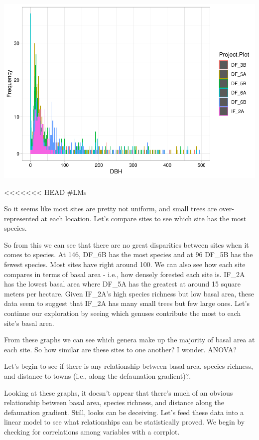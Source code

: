 \documentclass[
  12pt,
]{article}
\begin{document}
\includegraphics{GoldenGriffithsKnierMalinowski_ENV872_Project_files/figure-latex/DBH graphs-10.pdf}

\textless\textless\textless\textless\textless\textless\textless{} HEAD
\#LMs

So it seems like most sites are pretty not uniform, and small trees are
over-represented at each location. Let's compare sites to see which site
has the most species.

So from this we can see that there are no great disparities between
sites when it comes to species. At 146, DF\_6B has the most species and
at 96 DF\_5B has the fewest species. Most sites have right around 100.
We can also see how each site compares in terms of basal area - i.e.,
how densely forested each site is. IF\_2A has the lowest basal area
where DF\_5A has the greatest at around 15 square meters per hectare.
Given IF\_2A's high species richness but low basal area, these data seem
to suggest that IF\_2A has many small trees but few large ones. Let's
continue our exploration by seeing which genuses contribute the most to
each site's basal area.

From these graphs we can see which genera make up the majority of basal
area at each site. So how similar are these sites to one another? I
wonder. ANOVA?

Let's begin to see if there is any relationship between basal area,
species richness, and distance to towns (i.e., along the defaunation
gradient)?.

Looking at these graphs, it doesn't appear that there's much of an
obvious relationship between basal area, species richness, and distance
along the defaunation gradient. Still, looks can be deceiving. Let's
feed these data into a linear model to see what relationships can be
statistically proved. We begin by checking for correlations among
variables with a corrplot.
\end{document}
